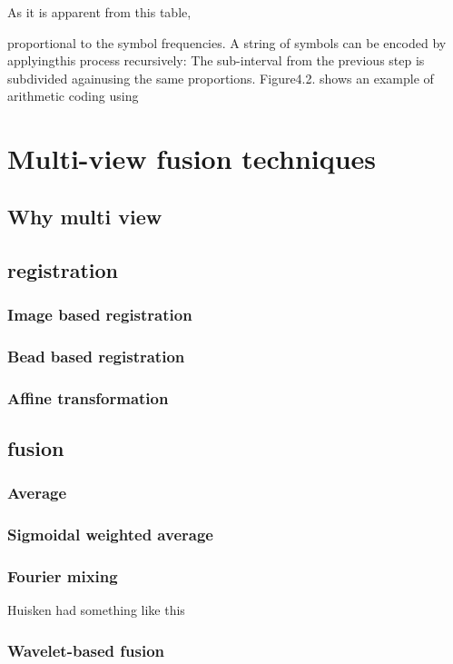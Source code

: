 \documentclass{diploma_style}
\begin{document}
As it is apparent from this table, 


proportional to the symbol frequencies. A string of symbols can be encoded by applyingthis process recursively: The sub-interval from the previous step is subdivided againusing the same proportions. Figure4.2. shows an example of arithmetic coding using

\section{Multi-view fusion techniques}
    \subsection{Why multi view}
    
    \subsection{registration}
        \subsubsection{Image based registration}
        \subsubsection{Bead based registration}
        \subsubsection{Affine transformation}
    \subsection{fusion}
        \subsubsection{Average}
        \subsubsection{Sigmoidal weighted average}
        \subsubsection{Fourier mixing}
        Huisken had something like this
        \subsubsection{Wavelet-based fusion}
\end{document}

